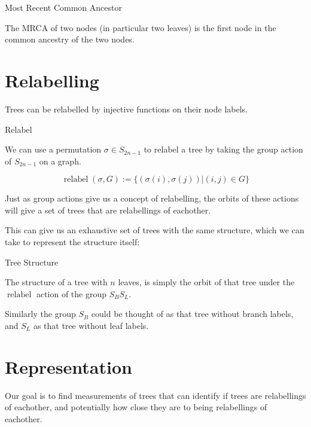 \documentclass[10pt,a4paper]{report}
\DeclareMathOperator{\relabel}{relabel}
\begin{document}
\begin{definition} Most Recent Common Ancestor

	The MRCA of two nodes (in particular two leaves) is the first node in the
	common ancestry of the two nodes.
\end{definition}


\section{Relabelling}

Trees can be relabelled by injective functions on their node labels.

\begin{definition} Relabel

	We can use a permutation $\sigma \in S_{2n-1}$ to relabel a tree by taking
	the group action of $S_{2n-1}$ on a graph.

	\[
		\relabel(\sigma, G) := \{(\sigma(i), \sigma(j)) | (i, j) \in G\}
	\]
\end{definition}

Just as group actions give us a concept of relabelling, the orbits of these
actions will give a set of trees that are relabellings of eachother.

This can give us an exhaustive set of trees with the same structure, which we
can take to represent the structure itself:

\begin{definition} Tree Structure

	The structure of a tree with $n$ leaves, is simply the orbit of that tree
	under the $\relabel$ action of the group ${S_B}{S_L}$.

	Similarly the group $S_B$ could be thought of as that tree without branch
	labels, and $S_L$ as that tree without leaf labels.
\end{definition}

\section{Representation}

Our goal is to find measurements of trees that can identify if trees are
relabellings of eachother, and potentially how close they are to being
relabellings of eachother.
\end{document}
